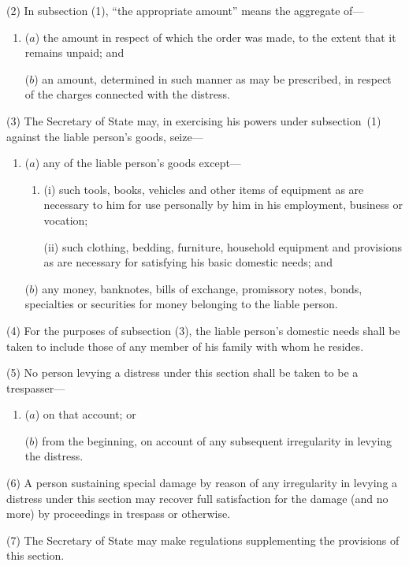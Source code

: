 \documentclass[12pt,a4paper]{article}
\begin{document}
(2) In subsection (1), “the appropriate amount” means the aggregate of—
\begin{enumerate}\item[]
($a$) the amount in respect of which the order was made, to the extent that it remains unpaid; and

($b$) an amount, determined in such manner as may be prescribed, in respect of the charges connected with the distress.
\end{enumerate}

(3) The Secretary of State may, in exercising his powers under subsection~(1)  against the liable person’s goods, seize—
\begin{enumerate}\item[]
($a$) any of the liable person’s goods except—
\begin{enumerate}\item[]
(i) such tools, books, vehicles and other items of equipment as are necessary to him for use personally by him in his employment, business or vocation;

(ii) such clothing, bedding, furniture, household equipment and provisions as are necessary for satisfying his basic domestic needs; and
\end{enumerate}

($b$) any money, banknotes, bills of exchange, promissory notes, bonds, specialties or securities for money belonging to the liable person.
\end{enumerate}

(4) For the purposes of subsection (3), the liable person’s domestic needs shall be taken to include those of any member of his family with whom he resides.

(5) No person levying a distress under this section shall be taken to be a trespasser—
\begin{enumerate}\item[]
($a$) on that account; or

($b$) from the beginning, on account of any subsequent irregularity in levying the distress.
\end{enumerate}

(6) A person sustaining special damage by reason of any irregularity in levying a distress under this section may recover full satisfaction for the damage (and no more) by proceedings in trespass or otherwise.

(7) The Secretary of State may make regulations supplementing the provisions of this section.
\end{document}
